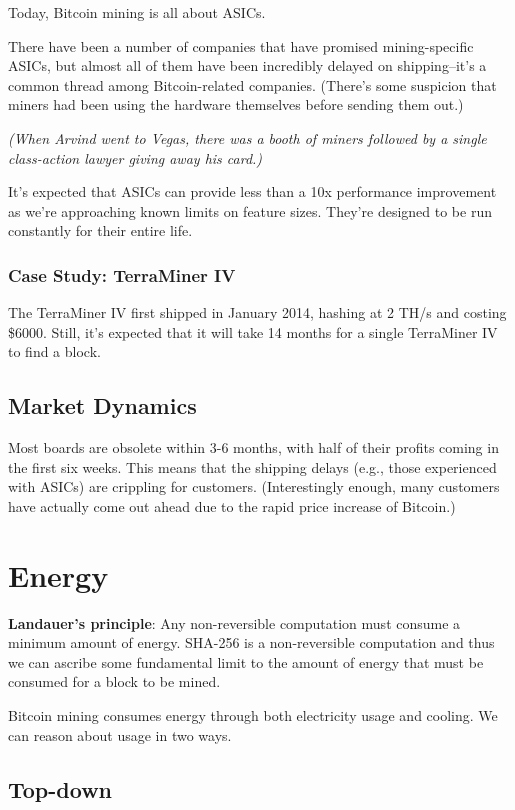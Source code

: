 \documentclass[12pt]{article}
\begin{document}
Today, Bitcoin mining is all about ASICs.

There have been a number of companies that have promised mining-specific ASICs, but almost all of them have been incredibly delayed on shipping--it's a common thread among Bitcoin-related companies. (There's some suspicion that miners had been using the hardware themselves before sending them out.)

\textit{(When Arvind went to Vegas, there was a booth of miners followed by a single class-action lawyer giving away his card.)}

It's expected that ASICs can provide less than a 10x performance improvement as we're approaching known limits on feature sizes. They're designed to be run constantly for their entire life.

\subsubsection*{Case Study: TerraMiner IV}

The TerraMiner IV first shipped in January 2014, hashing at 2 TH/s and costing \$6000. Still, it's expected that it will take 14 months for a single TerraMiner IV to find a block.

\subsection*{Market Dynamics}

Most boards are obsolete within 3-6 months, with half of their profits coming in the first six weeks. This means that the shipping delays (e.g., those experienced with ASICs) are crippling for customers. (Interestingly enough, many customers have actually come out ahead due to the rapid price increase of Bitcoin.)

\section*{Energy}

\textbf{Landauer's principle}: Any non-reversible computation must consume a minimum amount of energy. SHA-256 is a non-reversible computation and thus we can ascribe some fundamental limit to the amount of energy that must be consumed for a block to be mined.

Bitcoin mining consumes energy through both electricity usage and cooling. We can reason about usage in two ways.

\subsection*{Top-down}
\end{document}
